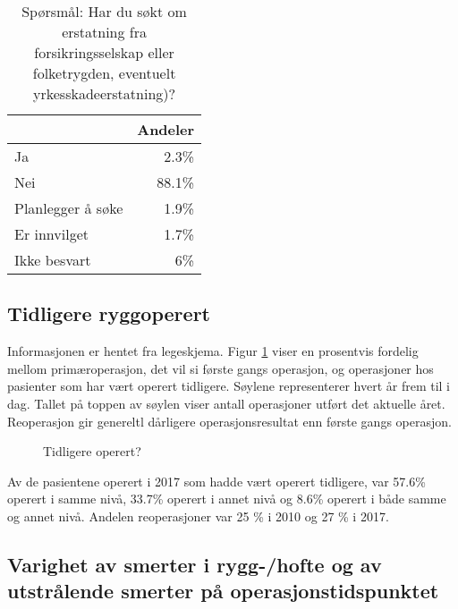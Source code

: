 \documentclass [norsk,a4paper,twoside]{article}\usepackage[]{graphicx}\usepackage[]{color}
\begin{document}
\begin{table}[ht]
\centering
\begin{tabular}{lr}
  \hline
 & Andeler \\ 
  \hline
Ja & 2.3\% \\ 
  Nei & 88.1\% \\ 
  Planlegger å søke & 1.9\% \\ 
  Er innvilget & 1.7\% \\ 
  Ikke besvart & 6\% \\ 
   \hline
\end{tabular}
\caption{Spørsmål: Har du søkt om erstatning fra forsikringsselskap eller folketrygden, 
		eventuelt yrkesskadeerstatning)?} 
\label{tab:Erst}
\end{table}


\clearpage

\subsection{Tidligere ryggoperert}
Informasjonen er hentet fra legeskjema.
Figur \ref{fig:TidlOp} viser en prosentvis fordelig mellom primæroperasjon, det vil si første gangs 
operasjon, og operasjoner hos pasienter som har vært operert tidligere.  
Søylene representerer hvert år frem til i dag. Tallet på toppen av søylen viser antall operasjoner utført 
det aktuelle året. Reoperasjon gir genereltl dårligere operasjonsresultat enn første gangs operasjon.



\begin{figure}[ht]
\caption{\label{fig:TidlOp} Tidligere operert? }
\end{figure}



Av de pasientene operert i 2017 som hadde vært operert tidligere, var 57.6\% 
operert i samme nivå, 33.7\% 
operert i annet nivå og 8.6\% 
operert i både samme og annet nivå.
Andelen reoperasjoner var 25 \% i 2010 og 27 \% i 2017.



\subsection{Varighet av smerter i rygg-/hofte og av utstrålende smerter på operasjonstidspunktet}
\end{document}
